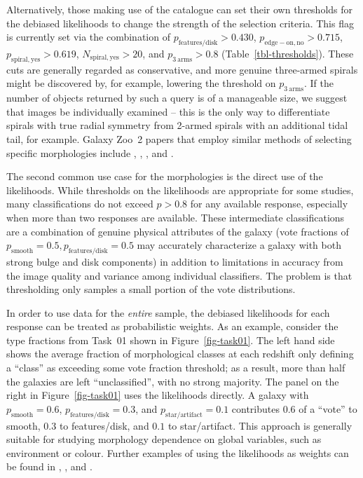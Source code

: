 \documentclass[useAMS,usenatbib]{mn2e}
\begin{document}
Alternatively, those making use of the catalogue can set their own thresholds for the debiased likelihoods to change the strength of the selection criteria. This flag is currently set via the combination of $p_\mathrm{features/disk}>0.430$, $p_\mathrm{edge-on,no}>0.715$, $p_\mathrm{spiral,yes}>0.619$, $N_\mathrm{spiral,yes}>20$, and $p_\mathrm{3~arms}>0.8$ (Table~\ref{tbl-thresholds}). These cuts are generally regarded as conservative, and more genuine three-armed spirals might be discovered by, for example, lowering the threshold on $p_\mathrm{3~arms}$. If the number of objects returned by such a query is of a manageable size, we suggest that images be individually examined -- this is the only way to differentiate spirals with true radial symmetry from 2-armed spirals with an additional tidal tail, for example. Galaxy Zoo~2 papers that employ similar methods of selecting specific morphologies include \citet{mas11c}, \citet{kav12a}, \citet{sim13}, and \citet{cas13}. 

The second common use case for the morphologies is the direct use of the likelihoods. While thresholds on the likelihoods are appropriate for some studies, many classifications do not exceed $p>0.8$ for any available response, especially when more than two responses are available. These intermediate classifications are a combination of genuine physical attributes of the galaxy (vote fractions of $p_\mathrm{smooth}=0.5,p_\mathrm{features/disk}=0.5$ may accurately characterize a galaxy with both strong bulge and disk components) in addition to limitations in accuracy from the image quality and variance among individual classifiers. The problem is that thresholding only samples a small portion of the vote distributions.

In order to use data for the {\it entire} sample, the debiased likelihoods for each response can be treated as probabilistic weights. As an example, consider the type fractions from Task~01 shown in Figure~\ref{fig-task01}. The left hand side shows the average fraction of morphological classes at each redshift only defining a ``class'' as exceeding some vote fraction threshold; as a result, more than half the galaxies are left ``unclassified'', with no strong majority. The panel on the right in Figure~\ref{fig-task01} uses the likelihoods directly. A galaxy with $p_\mathrm{smooth}=0.6$, $p_\mathrm{features/disk}=0.3$, and $p_\mathrm{star/artifact}=0.1$ contributes $0.6$ of a ``vote'' to smooth, $0.3$ to features/disk, and $0.1$ to star/artifact. This approach is generally suitable for studying morphology dependence on global variables, such as environment or colour. Further examples of using the likelihoods as weights can be found in \citet{bam09}, \citet{ski12}, and \citet{cas13}.
\end{document}
